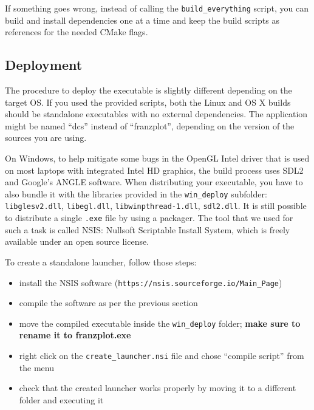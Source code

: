 If something goes wrong, instead of calling the \texttt{build\_everything} script,
you can build and install dependencies one at a time and keep the build
scripts as references for the needed CMake flags.

\subsection{Deployment}
The procedure to deploy the executable is slightly different depending
on the target OS. If you used the provided scripts, both the Linux and OS X builds
should be standalone executables with no external dependencies. The application might be
named ``dcs'' instead of ``franzplot'', depending on the version of the sources you are using.

On Windows, to help mitigate some bugs in the OpenGL Intel driver that is used on most
laptops with integrated Intel HD graphics, the build process uses SDL2 and Google's
ANGLE software. When distributing your executable, you have to also bundle it
with the libraries provided in the \texttt{win\_deploy} subfolder:
\texttt{libglesv2.dll}, \texttt{libegl.dll}, \texttt{libwinpthread-1.dll}, \texttt{sdl2.dll}.
It is still possible to distribute a single \texttt{.exe} file by using a packager.
The tool that we used for such a task is called NSIS: Nullsoft Scriptable Install System,
which is freely available under an open source license.

To create a standalone launcher, follow those steps:
\begin{itemize}
    \item install the NSIS software (\texttt{https://nsis.sourceforge.io/Main\_Page})
    \item compile the software as per the previous section
    \item move the compiled executable inside the \texttt{win\_deploy} folder;
        \textbf{make sure to rename it to franzplot.exe}
    \item right click on the \texttt{create\_launcher.nsi} file and chose
        ``compile script'' from the menu
    \item check that the created launcher works properly by moving it to a different
        folder and executing it
\end{itemize}
